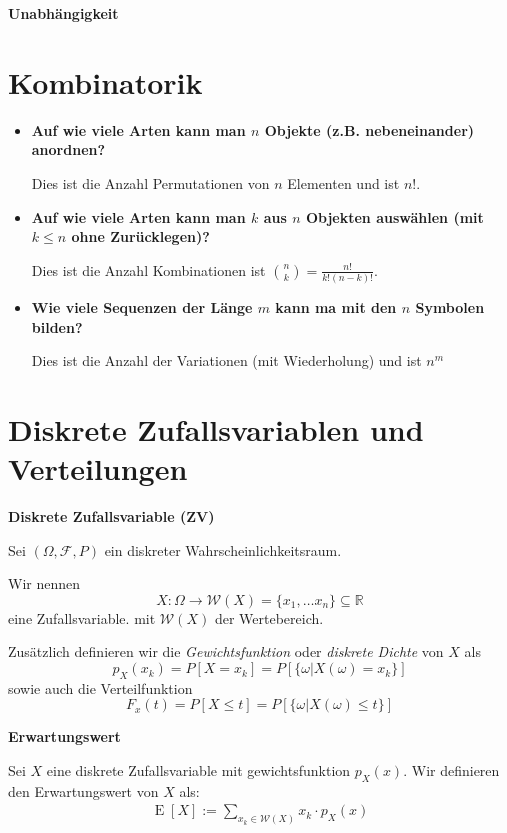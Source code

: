 \documentclass[25pt]{sciposter}
\newcommand{\R}{\mathbb{R}}
\newcommand{\F}{\mathcal{F}}
\newcommand{\W}{\mathcal{W}}
\newcommand{\E}{\operatorname{E}}
\newenvironment{method}[1]{\begin{mdframed}[backgroundcolor=blue!10,innertopmargin=15pt, innerbottommargin=15pt,nobreak=true]
		\textbf{#1 }
	}
	{ 
	\end{mdframed}
}
\begin{document}
\begin{multicols}{3}
\begin{method}{Unabhängigkeit}
\end{method}





\section*{Kombinatorik}

\begin{itemize}
	\item \textbf{Auf wie viele Arten kann man $n$ Objekte (z.B. nebeneinander) anordnen?}
	
	Dies ist die Anzahl Permutationen von $n$ Elementen und ist $n!$.
	
	
	\item 	\textbf{Auf wie viele Arten kann man $k$ aus $n$ Objekten auswählen (mit $k\leq n$ ohne Zurücklegen)?}
	
	Dies ist die Anzahl Kombinationen ist $\binom{n}{k} = \frac{n!}{k!(n-k)!}$.
	
	
	\item \textbf{Wie viele Sequenzen der Länge $m$ kann ma mit den $n$ Symbolen bilden?}
	
	Dies ist die Anzahl der Variationen (mit Wiederholung) und ist $n^m$
\end{itemize}


\section*{Diskrete Zufallsvariablen und Verteilungen}



\begin{method}{Diskrete Zufallsvariable (ZV)}
	Sei $(\Omega, \F, P)$ ein diskreter Wahrscheinlichkeitsraum.
	
	Wir nennen 
	$$X:\Omega \to \W(X) = \{x_1,\ldots x_n\}\subseteq \R$$
	eine Zufallsvariable. mit $\W(X)$ der Wertebereich.
	 
	Zusätzlich definieren wir die \textit{Gewichtsfunktion} oder \textit{diskrete Dichte} von $X$ als 
	$$p_X(x_k) = P[X = x_k] = P[\{ \omega | X(\omega) = x_k \}]$$
	sowie auch die Verteilfunktion 
	$$F_x(t) = P[X\leq t] = P[\{\omega | X(\omega) \leq t\}]$$

\end{method}


\begin{method}{Erwartungswert}
	Sei $X$ eine diskrete Zufallsvariable mit gewichtsfunktion $p_X(x)$. Wir definieren den Erwartungswert von $X$ als:
	\begin{align*}
		\E[X] := \sum_{x_k\in \W(X)} x_k \cdot p_X(x)
	\end{align*}
\end{method}



\end{multicols}
\end{document}
